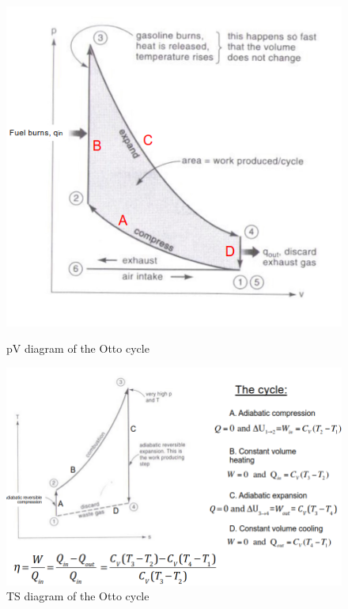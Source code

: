 \documentclass[../main.tex]{subfiles}
\begin{document}
\begin{figure}[hbt!]
\begin{minipage}{.5\textwidth}
    \centering
    \includegraphics[width=\linewidth]{IMAGES/Renewable/Screenshot from 2025-03-04 15-21-36.png}
    \caption{pV diagram of the Otto cycle}
\end{minipage}
\hfill
\begin{minipage}{.5\textwidth}
    \centering
    \includegraphics[width=\linewidth]{IMAGES/Renewable/Screenshot from 2025-03-04 15-22-18.png}
    \caption{TS diagram of the Otto cycle}
\end{minipage}
\end{figure}
\end{document}
